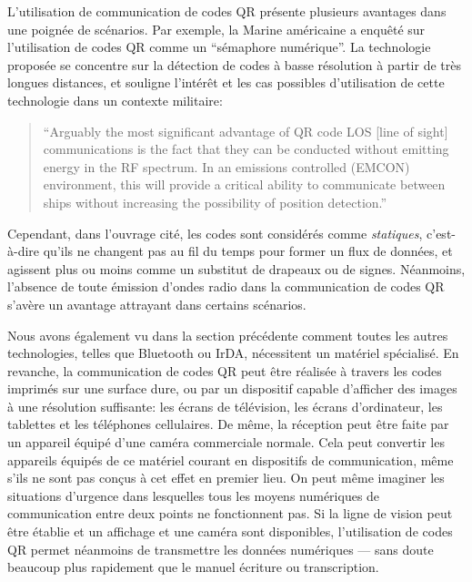 L'utilisation de communication de codes QR présente plusieurs avantages dans une poignée de scénarios. Par exemple, la Marine américaine a enquêté sur l'utilisation de codes QR comme un ``sémaphore numérique''. La technologie proposée se concentre sur la détection de codes à basse résolution à partir de très longues distances, et souligne l'intérêt et les cas possibles d'utilisation de cette technologie dans un contexte militaire:

\begin{quote}
``Arguably the most significant advantage of QR code LOS [line of sight] communications is the fact that they can be conducted without emitting energy in the RF spectrum. In an emissions controlled (EMCON) environment, this will provide a critical ability to communicate between ships without increasing the possibility of position detection.'' \citep[p.\ 46]{richter-msc}
\end{quote}

Cependant, dans l'ouvrage cité, les codes sont considérés comme \emph{statiques}, c'est-à-dire qu'ils ne changent pas au fil du temps pour former un flux de données, et agissent plus ou moins comme un substitut de drapeaux ou de signes. Néanmoins, l'absence de toute émission d'ondes radio dans la communication de codes QR s'avère un avantage attrayant dans certains scénarios.

Nous avons également vu dans la section précédente comment toutes les autres technologies, telles que Bluetooth ou IrDA, nécessitent un matériel spécialisé. En revanche, la communication de codes QR peut être réalisée à travers les codes imprimés sur une surface dure, ou par un dispositif capable d'afficher des images à une résolution suffisante: les écrans de télévision, les écrans d'ordinateur, les tablettes et les téléphones cellulaires. De même, la réception peut être faite par un appareil équipé d'une caméra commerciale normale. Cela peut convertir les appareils équipés de ce matériel courant en dispositifs de communication, même s'ils ne sont pas conçus à cet effet en premier lieu. On peut même imaginer les situations d'urgence dans lesquelles tous les moyens numériques de communication entre deux points ne fonctionnent pas. Si la ligne de vision peut être établie et un affichage et une caméra sont disponibles, l'utilisation de codes QR permet néanmoins de transmettre les données numériques --- sans doute beaucoup plus rapidement que le manuel écriture ou transcription.

